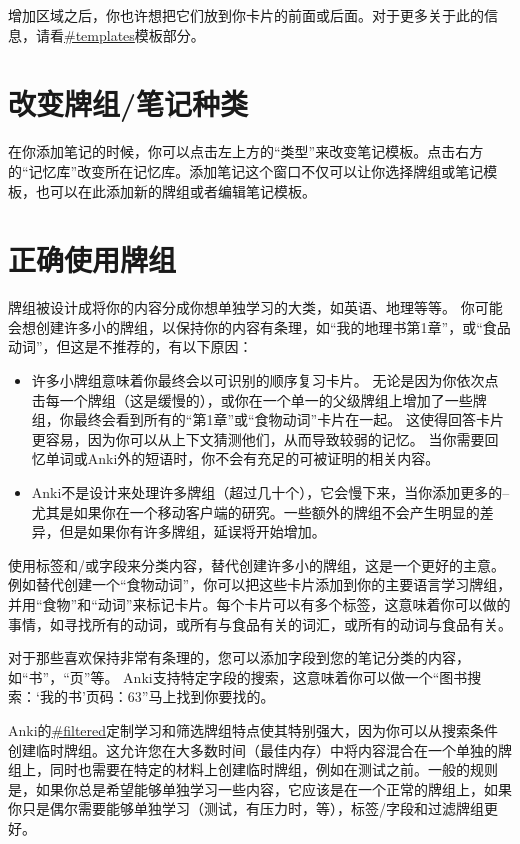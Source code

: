 \documentclass[a4paper]{book}
\begin{document}
	增加区域之后，你也许想把它们放到你卡片的前面或后面。对于更多关于此的信息，请看\url{#templates}模板部分。              
	
	\section{改变牌组/笔记种类}
	
	在你添加笔记的时候，你可以点击左上方的“类型”来改变笔记模板。点击右方的“记忆库”改变所在记忆库。添加笔记这个窗口不仅可以让你选择牌组或笔记模板，也可以在此添加新的牌组或者编辑笔记模板。
	
	\section{正确使用牌组}
	牌组被设计成将你的内容分成你想单独学习的大类，如英语、地理等等。 你可能会想创建许多小的牌组，以保持你的内容有条理，如“我的地理书第1章”，或“食品动词”，但这是不推荐的，有以下原因：
	
	\begin{itemize}
		\itemsep1pt\parskip0pt
		\item 许多小牌组意味着你最终会以可识别的顺序复习卡片。 无论是因为你依次点击每一个牌组（这是缓慢的），或你在一个单一的父级牌组上增加了一些牌组，你最终会看到所有的“第1章”或“食物动词”卡片在一起。 这使得回答卡片更容易，因为你可以从上下文猜测他们，从而导致较弱的记忆。 当你需要回忆单词或Anki外的短语时，你不会有充足的可被证明的相关内容。
		\item Anki不是设计来处理许多牌组（超过几十个），它会慢下来，当你添加更多的–尤其是如果你在一个移动客户端的研究。一些额外的牌组不会产生明显的差异，但是如果你有许多牌组，延误将开始增加。
	\end{itemize}
	
	使用标签和/或字段来分类内容，替代创建许多小的牌组，这是一个更好的主意。例如替代创建一个“食物动词”，你可以把这些卡片添加到你的主要语言学习牌组，并用“食物”和“动词”来标记卡片。每个卡片可以有多个标签，这意味着你可以做的事情，如寻找所有的动词，或所有与食品有关的词汇，或所有的动词与食品有关。
	
	对于那些喜欢保持非常有条理的，您可以添加字段到您的笔记分类的内容，如“书”，“页”等。 Anki支持特定字段的搜索，这意味着你可以做一个“图书搜索：‘我的书’页码：63”马上找到你要找的。
	
	Anki的\url{#filtered}定制学习和筛选牌组特点使其特别强大，因为你可以从搜索条件创建临时牌组。这允许您在大多数时间（最佳内存）中将内容混合在一个单独的牌组上，同时也需要在特定的材料上创建临时牌组，例如在测试之前。一般的规则是，如果你总是希望能够单独学习一些内容，它应该是在一个正常的牌组上，如果你只是偶尔需要能够单独学习（测试，有压力时，等），标签/字段和过滤牌组更好。
	
\end{document}
